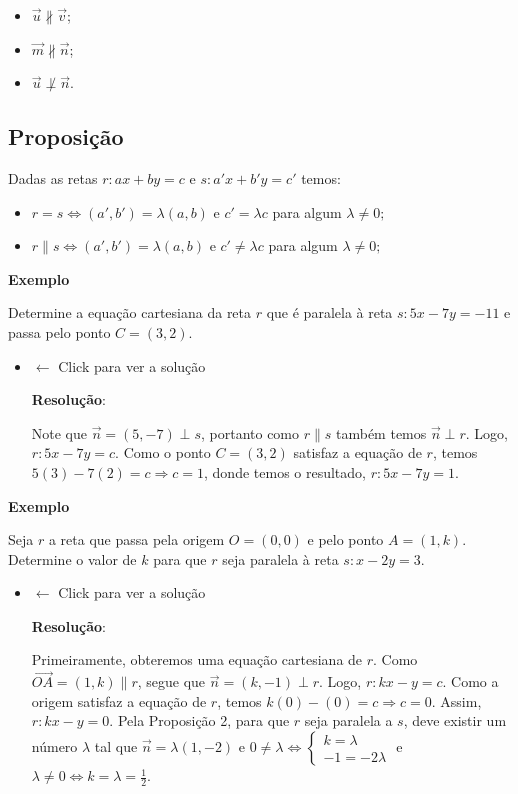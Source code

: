 \documentclass[
  brazilian,
  letterpaper,
  DIV=11,
  numbers=noendperiod]{scrreprt}
\providecommand{\tightlist}{%
  \setlength{\itemsep}{0pt}\setlength{\parskip}{0pt}}
\theoremstyle{definition}
\theoremstyle{plain}
\theoremstyle{definition}
\theoremstyle{remark}
\begin{document}
\begin{itemize}
\tightlist
\item
  \(\vec{u} \nparallel \vec{v}\);
\item
  \(\vec{m} \nparallel \vec{n}\);
\item
  \(\vec{u} \not\perp  \vec{n}\).
\end{itemize}

\subsection{Proposição}\label{proposiuxe7uxe3o-14}

Dadas as retas \(r:ax+by=c\) e \(s:a'x+b'y=c'\) temos:

\begin{itemize}
\tightlist
\item
  \(r=s \Leftrightarrow (a',b')=\lambda(a,b)\) e \(c'=\lambda c\) para
  algum \(\lambda \neq 0;\)
\item
  \(r \parallel s \Leftrightarrow (a',b')=\lambda(a,b)\) e
  \(c' \neq \lambda c\) para algum \(\lambda \neq 0;\)
\end{itemize}

\textbf{Exemplo}

Determine a equação cartesiana da reta \(r\) que é paralela à reta
\(s:5x-7y=-11\) e passa pelo ponto \(C=(3,2)\).

\begin{itemize}
\item
  \(\leftarrow\) Click para ver a solução

  \textbf{Resolução}:

  Note que \(\vec{n}=(5,-7)\perp s\), portanto como \(r\parallel s\)
  também temos \(\vec{n}\perp r\). Logo, \(r:5x-7y=c\). Como o ponto
  \(C=(3,2)\) satisfaz a equação de \(r\), temos
  \(5(3)-7(2)=c\Rightarrow c=1\), donde temos o resultado,
  \(r:5x-7y=1\).
\end{itemize}

\textbf{Exemplo}

Seja \(r\) a reta que passa pela origem \(O=(0,0)\) e pelo ponto
\(A=(1,k)\). Determine o valor de \(k\) para que \(r\) seja paralela à
reta \(s:x-2y=3\).

\begin{itemize}
\item
  \(\leftarrow\) Click para ver a solução

  \textbf{Resolução}:

  Primeiramente, obteremos uma equação cartesiana de \(r\). Como
  \(\overrightarrow{OA} = (1,k) \parallel r\), segue que
  \(\vec{n}=(k,-1)\perp r\). Logo, \(r:kx-y=c\). Como a origem satisfaz
  a equação de \(r\), temos \(k(0)-(0)=c\Rightarrow c=0\). Assim,
  \(r:kx-y=0\). Pela Proposição 2, para que \(r\) seja paralela a \(s\),
  deve existir um número \(\lambda\) tal que
  \(\vec{n} = \lambda (1,-2)\) e
  \(0 \neq \lambda \iff  \left\{ \begin{array}{l} k= \lambda \\ -1 = -2\lambda \end{array} \right.\)
  e \(\lambda \neq 0 \iff  k = \lambda = \frac{1}{2}\).
\end{itemize}
\end{document}
